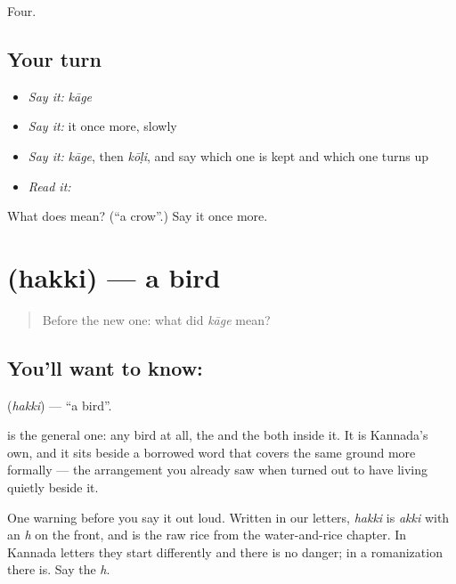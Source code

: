 \begin{grammarlens}[title={What you've built}]
Four.
\end{grammarlens}

\subsection*{Your turn}
\begin{itemize}
\raggedright
  \item \emph{Say it:} \emph{kāge}
  \item \emph{Say it:} it once more, slowly
  \item \emph{Say it:} \emph{kāge}, then \emph{kōḷi}, and say which one is kept and which one turns up
  \item \emph{Read it:} \textbf{}
\end{itemize}

\begin{tcolorbox}[breakable,colback=teal!4,colframe=teal!35!black,title={Before you move on}]
What does  mean? (\textquotedblleft{}a crow\textquotedblright{}.) Say it once more.
\end{tcolorbox}
\section[\texorpdfstring{\kn{ಹಕ್ಕಿ} (hakki)}{ಹಕ್ಕಿ (hakki)}]{ (hakki) — a bird}

\label{lesson:KA-C60-bird}



\begin{quote}
Before the new one: what did \emph{kāge} mean?
\end{quote}

\subsection*{You'll want to know: }
\textbf{} (\emph{hakki}) — \textquotedblleft{}a bird\textquotedblright{}.

 is the general one: any bird at all, the  and the  both inside it. It is Kannada's own, and it sits beside a borrowed word that covers the same ground more formally — the arrangement you already saw when  turned out to have  living quietly beside it.

One warning before you say it out loud. Written in our letters, \emph{hakki} is \emph{akki} with an \emph{h} on the front, and  is the raw rice from the water-and-rice chapter. In Kannada letters they start differently and there is no danger; in a romanization there is. Say the \emph{h}.

